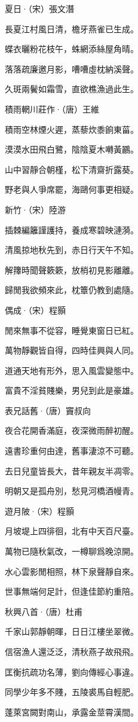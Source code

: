\documentclass[12pt,a4paper]{ctexbook}
\begin{document}
夏日·（宋）張文潛\par
長夏江村風日清，檐牙燕雀已生成。\par
蝶衣曬粉花枝午，蛛網添絲屋角晴。\par
落落疏廉邀月影，嘈嘈虛枕納溪聲。\par
久斑兩鬢如霜雪，直欲樵漁過此生。\par
積雨輞川莊作·（唐）王維\par
積雨空林煙火遲，蒸藜炊黍餉東菑。\par
漠漠水田飛白鷺，陰陰夏木囀黃鸝。\par
山中習靜合朝槿，松下清齋折露葵。\par
野老與人爭席罷，海鷗何事更相疑。\par
新竹·（宋）陸游\par
插棘編籬謹護持，養成寒碧映漣漪。\par
清風掠地秋先到，赤日行天午不知。\par
解籜時聞聲簌簌，放梢初見影離離。\par
歸閒我欲頻來此，枕簟仍教到處隨。\par
偶成·（宋）程顥\par
閒來無事不從容，睡覺東窗日已紅。\par
萬物靜觀皆自得，四時佳興與人同。\par
道通天地有形外，思入風雲變態中。\par
富貴不淫貧賤樂，男兒到此是豪雄。\par
表兄話舊·（唐）竇叔向\par
夜合花開香滿庭，夜深微雨醉初醒。\par
遠書珍重何由達，舊事淒涼不可聽。\par
去日兒童皆長大，昔年親友半凋零。\par
明朝又是孤舟別，愁見河橋酒幔青。\par
遊月陂·（宋）程顥\par
月坡堤上四徘徊，北有中天百尺臺。\par
萬物已隨秋氣改，一樽聊爲晚涼開。\par
水心雲影閒相照，林下泉聲靜自來。\par
世事無端何足計，但逢佳節約重陪。\par
秋興八首·（唐）杜甫\par
千家山郭靜朝暉，日日江樓坐翠微。\par
信宿漁人還泛泛，清秋燕子故飛飛。\par
匡衡抗疏功名薄，劉向傳經心事違。\par
同學少年多不賤，五陵裘馬自輕肥。\par
蓬萊宮闕對南山，承露金莖霄漢間。\par
\end{document}
